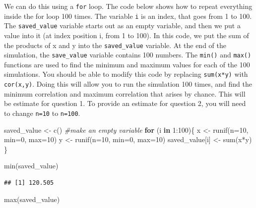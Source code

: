 \documentclass[
]{book}
\newenvironment{Shaded}{\begin{snugshade}}{\end{snugshade}}
\newcommand{\AttributeTok}[1]{\textcolor[rgb]{0.77,0.63,0.00}{#1}}
\newcommand{\CommentTok}[1]{\textcolor[rgb]{0.56,0.35,0.01}{\textit{#1}}}
\newcommand{\ControlFlowTok}[1]{\textcolor[rgb]{0.13,0.29,0.53}{\textbf{#1}}}
\newcommand{\DecValTok}[1]{\textcolor[rgb]{0.00,0.00,0.81}{#1}}
\newcommand{\FunctionTok}[1]{\textcolor[rgb]{0.00,0.00,0.00}{#1}}
\newcommand{\NormalTok}[1]{#1}
\newcommand{\OtherTok}[1]{\textcolor[rgb]{0.56,0.35,0.01}{#1}}
\newcommand{\SpecialCharTok}[1]{\textcolor[rgb]{0.00,0.00,0.00}{#1}}
\begin{document}
We can do this using a \texttt{for} loop. The code below shows how to repeat everything inside the for loop 100 times. The variable \texttt{i} is an index, that goes from 1 to 100. The \texttt{saved\_value} variable starts out as an empty variable, and then we put a value into it (at index position i, from 1 to 100). In this code, we put the sum of the products of x and y into the \texttt{saved\_value} variable. At the end of the simulation, the \texttt{save\_value} variable contains 100 numbers. The \texttt{min()} and \texttt{max()} functions are used to find the minimum and maximum values for each of the 100 simulations. You should be able to modify this code by replacing \texttt{sum(x*y)} with \texttt{cor(x,y)}. Doing this will allow you to run the simulation 100 times, and find the minimum correlation and maximum correlation that arises by chance. This will be estimate for question 1. To provide an estimate for question 2, you will need to change \texttt{n=10} to \texttt{n=100}.

\begin{Shaded}
\begin{Highlighting}[]
\NormalTok{saved\_value }\OtherTok{\textless{}{-}} \FunctionTok{c}\NormalTok{() }\CommentTok{\#make an empty variable}
\ControlFlowTok{for}\NormalTok{ (i }\ControlFlowTok{in} \DecValTok{1}\SpecialCharTok{:}\DecValTok{100}\NormalTok{)\{}
\NormalTok{  x }\OtherTok{\textless{}{-}} \FunctionTok{runif}\NormalTok{(}\AttributeTok{n=}\DecValTok{10}\NormalTok{, }\AttributeTok{min=}\DecValTok{0}\NormalTok{, }\AttributeTok{max=}\DecValTok{10}\NormalTok{)}
\NormalTok{  y }\OtherTok{\textless{}{-}} \FunctionTok{runif}\NormalTok{(}\AttributeTok{n=}\DecValTok{10}\NormalTok{, }\AttributeTok{min=}\DecValTok{0}\NormalTok{, }\AttributeTok{max=}\DecValTok{10}\NormalTok{)}
\NormalTok{  saved\_value[i] }\OtherTok{\textless{}{-}} \FunctionTok{sum}\NormalTok{(x}\SpecialCharTok{*}\NormalTok{y)}
\NormalTok{\}}

\FunctionTok{min}\NormalTok{(saved\_value)}
\end{Highlighting}
\end{Shaded}

\begin{verbatim}
## [1] 120.505
\end{verbatim}

\begin{Shaded}
\begin{Highlighting}[]
\FunctionTok{max}\NormalTok{(saved\_value)}
\end{Highlighting}
\end{Shaded}
\end{document}
